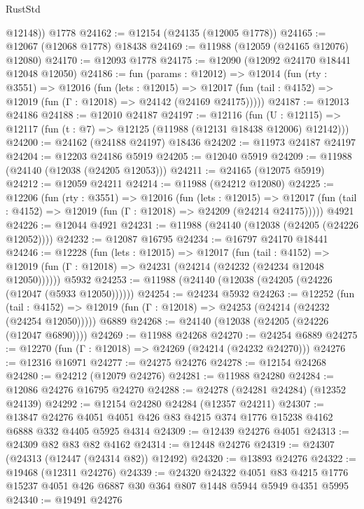 \begin{lexlean}{RustStd}
\begin{coremodule}
        @12148))
    @1778
@24162 := @12154 (@24135 (@12005 @1778))
@24165 := @12067 (@12068 @1778) @18438
@24169 := @11988 (@12059 (@24165 @12076) @12080)
@24170 := @12093 @1778
@24175 := @12090 (@12092 @24170 @18441 @12048 @12050)
@24186 := fun (params : @12012) =>
  @12014
    (fun (rty : @3551) =>
    @12016
      (fun (lets : @12015) =>
      @12017 (fun (tail : @4152) => @12019 (fun (Γ : @12018) => @24142 (@24169 @24175)))))
@24187 := @12013 @24186
@24188 := @12010 @24187
@24197 := @12116
    (fun (U : @12115) => @12117 (fun (t : @7) => @12125 (@11988 (@12131 @18438 @12006) @12142)))
@24200 := @24162 (@24188 @24197) @18436
@24202 := @11973 @24187 @24197
@24204 := @12203 @24186 @5919
@24205 := @12040 @5919
@24209 := @11988 (@24140 (@12038 (@24205 @12053)))
@24211 := @24165 (@12075 @5919)
@24212 := @12059 @24211
@24214 := @11988 (@24212 @12080)
@24225 := @12206
    (fun (rty : @3551) =>
    @12016
      (fun (lets : @12015) =>
      @12017 (fun (tail : @4152) => @12019 (fun (Γ : @12018) => @24209 (@24214 @24175)))))
    @4921
@24226 := @12044 @4921
@24231 := @11988 (@24140 (@12038 (@24205 (@24226 @12052))))
@24232 := @12087 @16795
@24234 := @16797 @24170 @18441
@24246 := @12228
    (fun (lets : @12015) =>
    @12017
      (fun (tail : @4152) =>
      @12019 (fun (Γ : @12018) => @24231 (@24214 (@24232 (@24234 @12048 @12050))))))
    @5932
@24253 := @11988 (@24140 (@12038 (@24205 (@24226 (@12047 (@5933 @12050))))))
@24254 := @24234 @5932
@24263 := @12252
    (fun (tail : @4152) => @12019 (fun (Γ : @12018) => @24253 (@24214 (@24232 (@24254 @12050)))))
    @6889
@24268 := @24140 (@12038 (@24205 (@24226 (@12047 @6890))))
@24269 := @11988 @24268
@24270 := @24254 @6889
@24275 := @12270 (fun (Γ : @12018) => @24269 (@24214 (@24232 @24270)))
@24276 := @12316 @16971
@24277 := @24275 @24276
@24278 := @12154 @24268
@24280 := @24212 (@12079 @24276)
@24281 := @11988 @24280
@24284 := @12086 @24276 @16795 @24270
@24288 := @24278 (@24281 @24284) (@12352 @24139)
@24292 := @12154 @24280 @24284 (@12357 @24211)
@24307 := @13847
    @24276
    @4051
    @4051
    @426
    @83
    @4215
    @374
    @1776
    @15238
    @4162
    @6888
    @332
    @4405
    @5925
    @4314
@24309 := @12439 @24276 @4051
@24313 := @24309 @82 @83 @82 @4162
@24314 := @12448 @24276
@24319 := @24307 (@24313 (@12447 (@24314 @82)) @12492)
@24320 := @13893 @24276
@24322 := @19468 (@12311 @24276)
@24339 := @24320
    @24322
    @4051
    @83
    @4215
    @1776
    @15237
    @4051
    @426
    @6887
    @30
    @364
    @807
    @1448
    @5944
    @5949
    @4351
    @5995
@24340 := @19491 @24276

\end{coremodule}
\end{lexlean}
